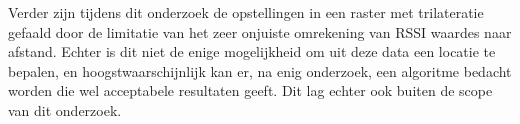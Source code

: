 Verder zijn tijdens dit onderzoek de opstellingen in een raster met trilateratie gefaald door de limitatie van het zeer onjuiste omrekening van RSSI waardes naar afstand. Echter is dit niet de enige mogelijkheid om uit deze data een locatie te bepalen, en hoogstwaarschijnlijk kan er, na enig onderzoek, een algoritme bedacht worden die wel acceptabele resultaten geeft. Dit lag echter ook buiten de scope van dit onderzoek.